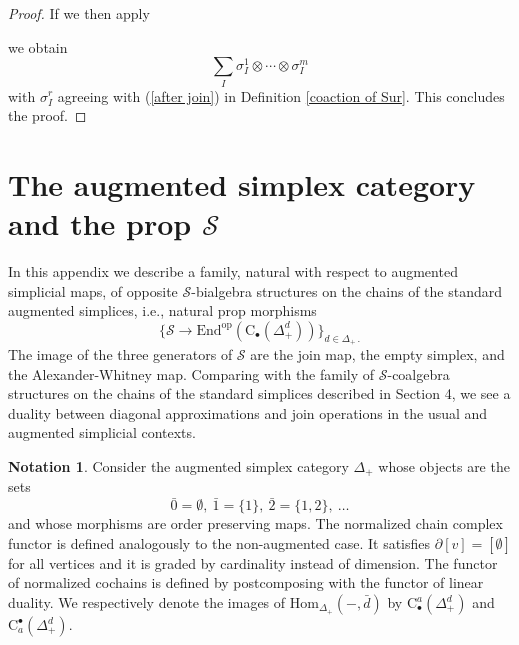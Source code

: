 \documentclass{amsart}
\renewcommand{\S}{\mathcal{S}}
\newcommand{\chains}{\mathrm{C}_\bullet}
\newcommand{\cochains}{\mathrm{C}^\bullet}
\newcommand{\tensor}{\otimes}
\newcommand{\Hom}{\mathrm{Hom}}
\newcommand{\End}{\mathrm{End}}
\theoremstyle{definition}
\newtheorem{notation}[theorem]{Notation}
\begin{document}
\begin{proof}
		If we then apply \par
		\begin{center}
		\end{center}
		we obtain
		\begin{equation*}
		\sum_I\sigma^1_I\tensor\cdots\tensor\sigma^m_I
		\end{equation*}
		with $\sigma_I^r$ agreeing with (\ref{after join}) in Definition \ref{coaction of Sur}. This concludes the proof.
	\end{proof}
	
	\section{The augmented simplex category and the prop $\S$}
	In this appendix we describe a family, natural with respect to augmented simplicial maps, of opposite $\S$-bialgebra structures on the chains of the standard augmented simplices, i.e., natural prop morphisms $$\big\{\S\to\End^{\mathrm{op}}(\chains(\Delta_+^d))\big\}_{d\in\Delta_+\,.}$$	
	The image of the three generators of $\S$ are the join map, the empty simplex, and the Alexander-Whitney map. Comparing with the family of $\S$-coalgebra structures on the chains of the standard simplices described in Section 4, we see a duality between diagonal approximations and join operations in the usual and augmented simplicial contexts.
	
	\begin{notation}
	    Consider the augmented simplex category $\Delta_+$ whose objects are the sets $$\bar 0=\emptyset,\ \bar 1=\{1\},\ \bar 2=\{1,2\},\ \dots$$ and whose morphisms are order preserving maps. The normalized chain complex functor is defined analogously to the non-augmented case. It satisfies $\partial [v]=[\emptyset]$ for all vertices and it is graded by cardinality instead of dimension. The functor of normalized cochains is defined by postcomposing with the functor of linear duality. We respectively denote the images of $\Hom_{\Delta_+}(-,\bar{d})$ by $\chains^a(\Delta_+^d)$ and $\cochains_a(\Delta_+^d)$.
	\end{notation}	
	
\end{document}
